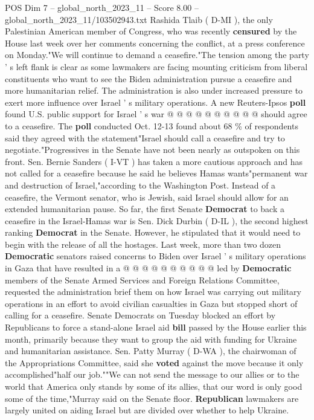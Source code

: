 \begin{textsample}{POS Dim 7 – global\_north\_2023\_11 – Score 8.00 – global\_north\_2023\_11/103502943.txt}
Rashida Tlaib ( D-MI ), the only Palestinian American member of Congress, who was recently \textbf{censured} by the House last week over her comments concerning the conflict, at a press conference on Monday."We will continue to demand a ceasefire."The tension among the party ' s left flank is clear as some lawmakers are facing mounting criticism from liberal constituents who want to see the Biden administration pursue a ceasefire and more humanitarian relief.
The administration is also under increased pressure to exert more influence over Israel ' s military operations.
A new Reuters-Ipsos \textbf{poll} found U.S. public support for Israel ' s war @ @ @ @ @ @ @ @ @ @ should agree to a ceasefire.
The \textbf{poll} conducted Oct. 12-13 found about 68 \% of respondents said they agreed with the statement"Israel should call a ceasefire and try to negotiate."Progressives in the Senate have not been nearly as outspoken on this front.
Sen.
Bernie Sanders ( I-VT ) has taken a more cautious approach and has not called for a ceasefire because he said he believes Hamas wants"permanent war and destruction of Israel,"according to the Washington Post.
Instead of a ceasefire, the Vermont senator, who is Jewish, said Israel should allow for an extended humanitarian pause.
So far, the first Senate \textbf{Democrat} to back a ceasefire in the Israel-Hamas war is Sen.
Dick Durbin ( D-IL ), the second highest ranking \textbf{Democrat} in the Senate.
However, he stipulated that it would need to begin with the release of all the hostages.
Last week, more than two dozen \textbf{Democratic} senators raised concerns to Biden over Israel ' s military operations in Gaza that have resulted in a @ @ @ @ @ @ @ @ @ @ led by \textbf{Democratic} members of the Senate Armed Services and Foreign Relations Committee, requested the administration brief them on how Israel was carrying out military operations in an effort to avoid civilian casualties in Gaza but stopped short of calling for a ceasefire.
Senate Democrats on Tuesday blocked an effort by Republicans to force a stand-alone Israel aid \textbf{bill} passed by the House earlier this month, primarily because they want to group the aid with funding for Ukraine and humanitarian assistance.
Sen.
Patty Murray ( D-WA ), the chairwoman of the Appropriations Committee, said she \textbf{voted} against the move because it only accomplished"half our job.""We can not send the message to our allies or to the world that America only stands by some of its allies, that our word is only good some of the time,"Murray said on the Senate floor. \textbf{Republican} lawmakers are largely united on aiding Israel but are divided over whether to help Ukraine.

\end{textsample}
